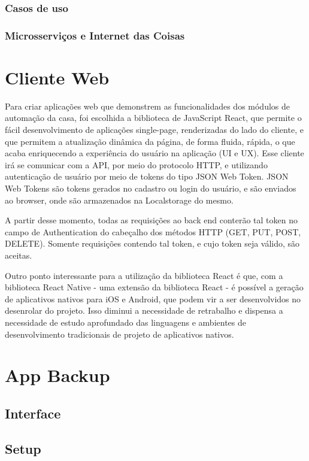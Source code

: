 \subsubsection{Casos de uso} %

\subsubsection{Microsserviços e Internet das Coisas} %

\section{Cliente Web}
Para criar aplicações web que demonstrem as funcionalidades dos módulos de automação da casa, foi escolhida a biblioteca de JavaScript React, que permite o fácil desenvolvimento de aplicações single-page, renderizadas do lado do cliente, e que permitem a atualização dinâmica da página, de forma fluida, rápida, o que acaba enriquecendo a experiência do usuário na aplicação (UI e UX). Esse cliente irá se comunicar com a API, por meio do protocolo HTTP, e utilizando autenticação de usuário por meio  de tokens do tipo JSON Web Token. JSON Web Tokens são tokens gerados no cadastro ou login do usuário, e são enviados ao browser, onde são armazenados na Localstorage do mesmo.

A partir desse momento, todas as requisições ao back end conterão tal token no campo de Authentication do cabeçalho dos métodos HTTP (GET, PUT, POST, DELETE). Somente requisições contendo tal token, e cujo token seja válido, são aceitas.

Outro ponto interessante para a utilização da biblioteca React é que, com a biblioteca React Native - uma extensão da biblioteca React - é possível a geração de aplicativos nativos para iOS e Android, que podem vir a ser desenvolvidos no desenrolar do projeto. Isso diminui a necessidade de retrabalho e dispensa a necessidade de estudo aprofundado das linguagens e ambientes de desenvolvimento tradicionais de projeto de aplicativos nativos.

\section{App Backup}
\subsection{Interface}
\subsection{Setup}
